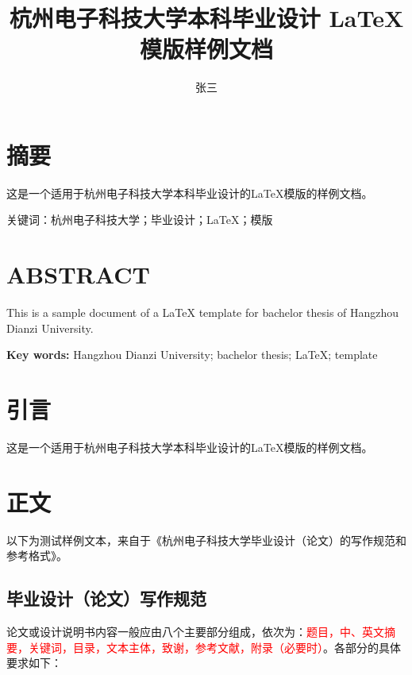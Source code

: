 \documentclass{HDU-Bachelor-Thesis}
\title{杭州电子科技大学本科毕业设计 \LaTeX{} 模版样例文档}
\author{张三}
\begin{document}
\pagestyle{empty}
%

\clearpage
\pagestyle{HDU-bachelor-empty}

\section*{摘\hspace{2em}要}

这是一个适用于杭州电子科技大学本科毕业设计的\LaTeX{}模版的样例文档。

\vspace{\baselineskip}\noindent
\textsf{关键词：}杭州电子科技大学；毕业设计；\LaTeX；模版

\clearpage

\section*{\textbf{ABSTRACT}}

This is a sample document of a \LaTeX{} template for bachelor thesis of Hangzhou Dianzi University.

\vspace{\baselineskip}\noindent
\textbf{Key words:} Hangzhou Dianzi University; bachelor thesis; \LaTeX; template

\clearpage
\tableofcontents

\clearpage
\pagestyle{HDU-bachelor}

\section{引言}

这是一个适用于杭州电子科技大学本科毕业设计的\LaTeX\cite{lamport1994latex}模版的样例文档。

\clearpage
\section{正文}

以下为测试样例文本，来自于《杭州电子科技大学毕业设计（论文）的写作规范和参考格式》。

\subsection{毕业设计（论文）写作规范}

论文或设计说明书内容一般应由八个主要部分组成，依次为：\textcolor{red}{题目，中、英文摘要，关键词，目录，文本主体，致谢，参考文献，附录（必要时）}。各部分的具体要求如下：
\end{document}
